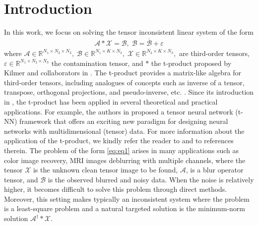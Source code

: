 \documentclass[11pt]{article}
\def\fm#1{\mathcal{#1}}
\def\r{\mathbb{R}}
\begin{document}
\section{Introduction}
In this work, we focus on solving the tensor inconsistent  linear system  of the form
\begin{align}
\label{eq:eq1}
\mathcal{A} * \mathcal{X} =  \mathcal{B},\;  \fm B = \overline{\fm B} + \varepsilon
\end{align}
where $\mathcal{A}\in\mathbb{R}^{N_1\times N_2\times N_3},\;
\mathcal{B}\in\mathbb{R}^{N_1\times K\times N_3},\;
\mathcal{X}\in\mathbb{R}^{N_2\times K\times N_3},$  are third-order tensors, $\varepsilon \in \r^{N_1\times N_2\times N_3}$ the contamination tensor,  and $*$ the t-product proposed by Kilmer and collaborators in  \cite{kilmer2011facto, kilmer2013thirdOrder}. The t-product provides a matrix-like algebra for third-order tensors, including analogues of  concepts such as inverse of a tensor, transpose, orthogonal projections, and  pseudo-inverse, etc. \cite{kilmer2011facto, kilmer2013thirdOrder}. Since its introduction in \cite{kilmer2011facto}, the t-product has been applied in several theoretical and practical applications. For example, the authors in \cite{newman2018} proposed a tensor neural network (t-NN) framework that offers an exciting new paradigm for designing neural networks with multidimensional (tensor) data. For more information about the application of the t-product, we  kindly refer the reader to  \cite{zhang2018, qi2021, wang2020, newman2018, miao2020gener} and to  references therein. The problem of the form \eqref{eq:eq1} arises in many applications such as color image recovery,  MRI images deblurring with multiple channels, where the tensor  $\fm X$ is the unknown clean tensor image to be found, $\fm A$, is a blur operator tensor, and $\fm B$ is the observed blurred and noisy data. When the noise is relatively higher, it becomes difficult to solve this problem  through direct methods. Moreover, this setting makes typically an inconsistent system  where the problem is a least-square problem and a natural targeted solution is the minimum-norm  solution $\fm A^\dagger * \fm X$.
\end{document}
